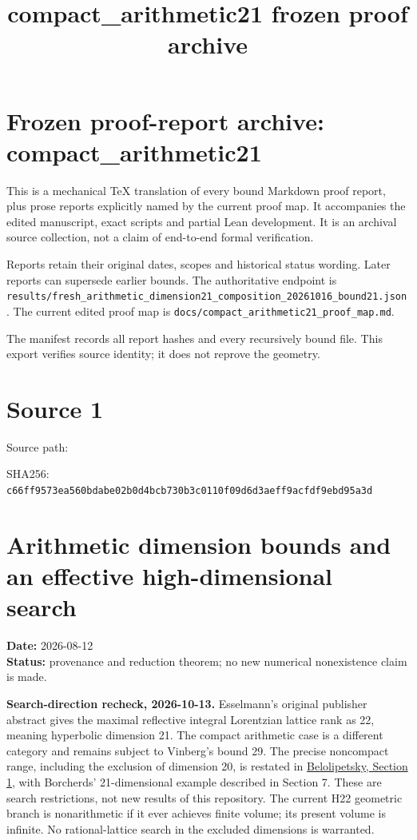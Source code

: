 \documentclass[
  10pt,
]{report}
\title{compact\_arithmetic21 frozen proof archive}
\author{}
\date{}
\newcounter{none} %
\begin{document}
\maketitle

\chapter{Frozen proof-report archive:
compact\_arithmetic21}\label{frozen-proof-report-archive-compact_arithmetic21}

This is a mechanical TeX translation of every bound Markdown proof
report, plus prose reports explicitly named by the current proof map. It
accompanies the edited manuscript, exact scripts and partial Lean
development. It is an archival source collection, not a claim of
end-to-end formal verification.

Reports retain their original dates, scopes and historical status
wording. Later reports can supersede earlier bounds. The authoritative
endpoint is
\nolinkurl{results/fresh_arithmetic_dimension21_composition_20261016_bound21.json}.
The current edited proof map is
\texttt{docs/compact\_arithmetic21\_proof\_map.md}.

The manifest records all report hashes and every recursively bound file.
This export verifies source identity; it does not reprove the geometry.

\clearpage

\chapter{Source 1}\label{source-1}

Source path:

SHA256:
\nolinkurl{c66ff9573ea560bdabe02b0d4bcb730b3c0110f09d6d3aeff9acfdf9ebd95a3d}

\chapter{Arithmetic dimension bounds and an effective high-dimensional
search}\label{arithmetic-dimension-bounds-and-an-effective-high-dimensional-search}

\textbf{Date:} 2026-08-12\\
\textbf{Status:} provenance and reduction theorem; no new numerical
nonexistence claim is made.

\textbf{Search-direction recheck, 2026-10-13.} Esselmann's original
publisher abstract gives the maximal reflective integral Lorentzian
lattice rank as 22, meaning hyperbolic dimension 21. The compact
arithmetic case is a different category and remains subject to Vinberg's
bound 29. The precise noncompact range, including the exclusion of
dimension 20, is restated in
\href{https://arxiv.org/pdf/1506.03111}{Belolipetsky, Section 1}, with
Borcherds' 21-dimensional example described in Section 7. These are
search restrictions, not new results of this repository. The current H22
geometric branch is nonarithmetic if it ever achieves finite volume; its
present volume is infinite. No rational-lattice search in the excluded
dimensions is warranted.
\end{document}

